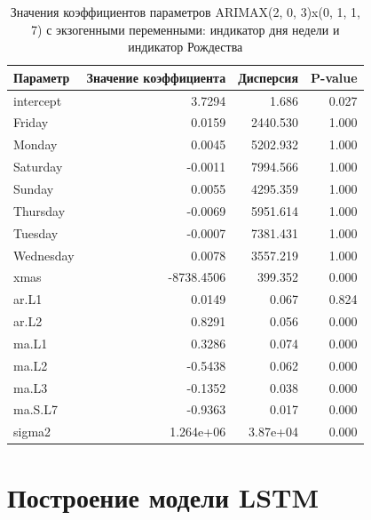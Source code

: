 \begin{table}%
	\caption{Значения коэффициентов параметров ARIMAX(2, 0, 3)x(0, 1, 1, 7) с экзогенными переменными: индикатор дня недели и индикатор Рождества}\label{tbl:cmp-1}
	\centering
	\begin{tabular}{|l|r||r|r|}
		\hline
			Параметр           &     Значение коэффициента  &  Дисперсия  &  P-value \\
		\hline
			intercept          &     3.7294                 &     1.686 &   0.027 \\
			Friday             &     0.0159                 &  2440.530 &   1.000 \\
			Monday             &     0.0045                 &  5202.932 &   1.000 \\
			Saturday           &    -0.0011                 &  7994.566 &   1.000 \\
			Sunday             &     0.0055                 &  4295.359 &   1.000 \\
			Thursday           &    -0.0069                 &  5951.614 &   1.000 \\
			Tuesday            &    -0.0007                 &  7381.431 &   1.000 \\
			Wednesday          &     0.0078                 &  3557.219 &   1.000 \\
			xmas               & -8738.4506                 &   399.352 &   0.000 \\
			ar.L1              &     0.0149                 &     0.067 &   0.824 \\
			ar.L2              &     0.8291                 &     0.056 &   0.000 \\
			ma.L1              &     0.3286                 &     0.074 &   0.000 \\
			ma.L2              &    -0.5438                 &     0.062 &   0.000 \\
			ma.L3              &    -0.1352                 &     0.038 &   0.000 \\
			ma.S.L7            &    -0.9363                 &     0.017 &   0.000 \\
			sigma2             &  1.264e+06                 &  3.87e+04 &   0.000 \\
		\hline
	\end{tabular}
	\label{tbl:arimax_coeffs_exogen}
\end{table}


\section{Построение модели LSTM}

